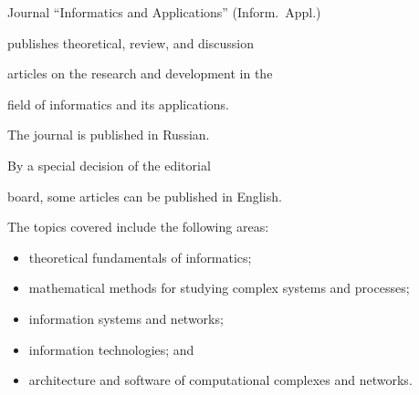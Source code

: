 \vspace*{-60pt}





{\small





\noindent


Journal ``Informatics and Applications'' (Inform.\ Appl.)


publishes theoretical, review, and discussion


articles on the research and development in the


field of informatics and its applications.





The journal is published in Russian.


By a special decision of the editorial


board, some articles can be published in English.








The topics covered include the following areas:


\begin{itemize}


               \item


     theoretical fundamentals of informatics; \\[-14pt]


\item


mathematical methods for studying complex systems and processes; \\[-14pt]


\item


information systems and networks;\\[-14pt]


\item


information technologies; and \\[-14pt]


\item


architecture and software of computational complexes and networks. \\[-14pt]


\end{itemize}





}
